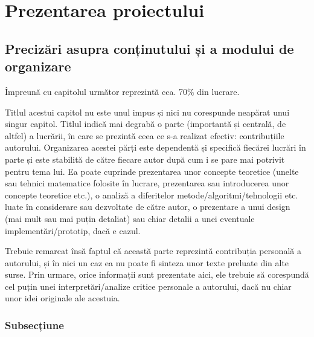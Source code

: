 \chapter{Prezentarea proiectului}

\section{Precizări asupra conținutului și a modului de organizare}

Împreună cu capitolul următor reprezintă cca. 70\% din lucrare. 

Titlul acestui capitol nu este unul impus și nici nu corespunde neapărat unui singur capitol. 
Titlul indică mai degrabă o parte (importantă și centrală, de altfel) a lucrării, în care se prezintă 
ceea ce s-a realizat efectiv: contribuțiile autorului. Organizarea acestei părți este dependentă și 
specifică fiecărei lucrări în parte și este stabilită de către fiecare autor după cum i se pare mai 
potrivit pentru tema lui. Ea poate cuprinde prezentarea unor concepte teoretice (unelte sau tehnici
matematice folosite în lucrare, prezentarea sau introducerea unor concepte teoretice etc.),  o 
analiză a diferitelor metode/algoritmi/tehnologii etc. luate în considerare sau dezvoltate de către 
autor, o prezentare a unui design (mai mult sau mai puțin detaliat) sau chiar detalii a unei 
eventuale implementări/prototip, dacă e cazul.

Trebuie remarcat însă faptul că această parte reprezintă contribuția personală a autorului, și în nici 
un caz ea nu poate fi sinteza unor texte preluate din alte surse. Prin urmare, orice informații sunt 
prezentate aici, ele trebuie să corespundă cel puțin unei interpretări/analize critice personale a 
autorului, dacă nu chiar unor idei originale ale acestuia. 


\subsection{Subsecțiune}

